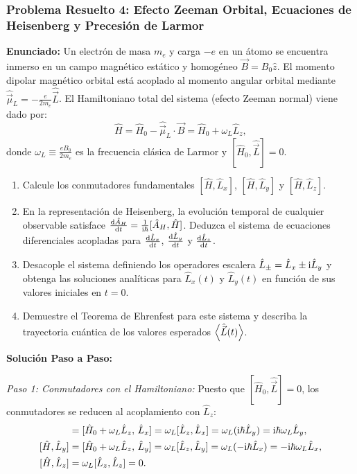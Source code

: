 \subsubsection[Problema 4: Efecto Zeeman y precesión de Larmor]{Problema Resuelto 4: Efecto Zeeman Orbital, Ecuaciones de Heisenberg y Precesión de Larmor}
\begin{ejemplobox}
    \textbf{Enunciado:} Un electrón de masa $m_e$ y carga $-e$ en un átomo se encuentra inmerso en un campo magnético estático y homogéneo $\vec{B} = B_0\hat{z}$. El momento dipolar magnético orbital está acoplado al momento angular orbital mediante $\hat{\vec{\mu}}_L = -\frac{e}{2m_e}\hat{\vec{L}}$. El Hamiltoniano total del sistema (efecto Zeeman normal) viene dado por:
    \begin{equation}
        \hat{H} = \hat{H}_0 - \hat{\vec{\mu}}_L \cdot \vec{B} = \hat{H}_0 + \omega_L \hat{L}_z,
    \end{equation}
    donde $\omega_L \equiv \frac{e B_0}{2m_e}$ es la frecuencia clásica de Larmor y $[\hat{H}_0, \hat{\vec{L}}] = 0$.
    \begin{enumerate}
        \item Calcule los conmutadores fundamentales $[\hat{H}, \hat{L}_x]$, $[\hat{H}, \hat{L}_y]$ y $[\hat{H}, \hat{L}_z]$.
        \item En la representación de Heisenberg, la evolución temporal de cualquier observable satisface $\frac{\mathrm{d}\hat{A}_H}{\mathrm{d} t} = \frac{1}{\mathrm{i}\hbar}[\hat{A}_H, \hat{H}]$. Deduzca el sistema de ecuaciones diferenciales acopladas para $\frac{\mathrm{d}\hat{L}_x}{\mathrm{d} t}$, $\frac{\mathrm{d}\hat{L}_y}{\mathrm{d} t}$ y $\frac{\mathrm{d}\hat{L}_z}{\mathrm{d} t}$.
        \item Desacople el sistema definiendo los operadores escalera $\hat{L}_\pm = \hat{L}_x \pm \mathrm{i}\hat{L}_y$ y obtenga las soluciones analíticas para $\hat{L}_x(t)$ y $\hat{L}_y(t)$ en función de sus valores iniciales en $t = 0$.
        \item Demuestre el Teorema de Ehrenfest para este sistema y describa la trayectoria cuántica de los valores esperados $\left\langle \hat{\vec{L}}(t) \right\rangle$.
    \end{enumerate}

    \textbf{Solución Paso a Paso:}

    \textit{Paso 1: Conmutadores con el Hamiltoniano:}
    Puesto que $[\hat{H}_0, \hat{\vec{L}}] = 0$, los conmutadores se reducen al acoplamiento con $\hat{L}_z$:
    \begin{align}
        [\hat{H}, \hat{L}_x] &= [\hat{H}_0 + \omega_L\hat{L}_z, \, \hat{L}_x] = \omega_L [\hat{L}_z, \hat{L}_x] = \omega_L(\iu\hbar\hat{L}_y) = \iu\hbar\omega_L\hat{L}_y, \\
        [\hat{H}, \hat{L}_y] &= [\hat{H}_0 + \omega_L\hat{L}_z, \, \hat{L}_y] = \omega_L [\hat{L}_z, \hat{L}_y] = \omega_L(-\iu\hbar\hat{L}_x) = -\iu\hbar\omega_L\hat{L}_x, \\
        [\hat{H}, \hat{L}_z] &= \omega_L [\hat{L}_z, \hat{L}_z] = 0.
    \end{align}


\end{ejemplobox}
